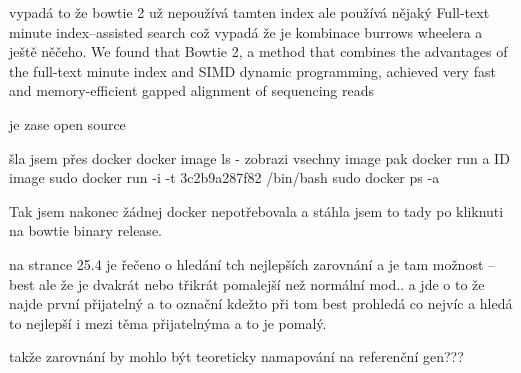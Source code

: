 \documentclass[czech,DP]{thesiskiv}
\begin{document}
vypadá to že bowtie 2 už nepoužívá tamten index ale používá nějaký Full-text minute index–assisted search což vypadá že je kombinace burrows wheelera a ještě něčeho.
We found that Bowtie 2, a method that combines the advantages of the full-text minute index and SIMD dynamic programming, achieved very fast and memory-efficient gapped alignment of sequencing reads

je zase open source
\cite{bowtie2}


šla jsem přes docker docker image ls - zobrazi vsechny image pak docker run a ID image
sudo docker run -i -t 3c2b9a287f82 /bin/bash
sudo docker ps -a

Tak jsem nakonec žádnej docker nepotřebovala a stáhla jsem to tady %
 po kliknuti na bowtie binary release.

na strance 25.4 je řečeno o hledání tch nejlepších zarovnání a je tam možnost --best ale že je dvakrát nebo třikrát pomalejší než normální mod.. a jde o to že najde první přijatelný a to označní kdežto při tom best prohledá co nejvíc a hledá to nejlepší i mezi těma přijatelnýma a to je pomalý.

takže zarovnání by mohlo být teoreticky namapování na referenční gen???
 
% 
%
\nocite{*}

{\raggedright\small

}
\end{document}
